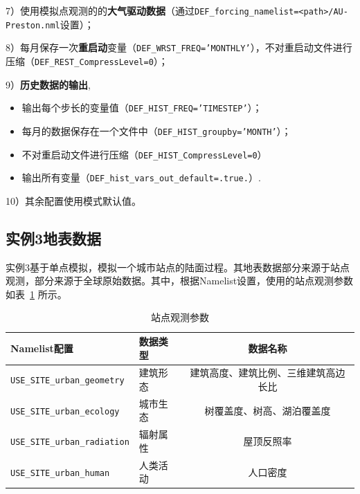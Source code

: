 \par
7）使用模拟点观测的的\textbf{大气驱动数据}（通过\texttt{DEF\_forcing\_namelist=<path>/AU-Preston.nml}设置）；\par
8）每月保存一次\textbf{重启动}变量（\texttt{DEF\_WRST\_FREQ='MONTHLY'}），不对重启动文件进行压缩（\texttt{DEF\_\allowbreak REST\_\allowbreak CompressLevel=0}）；\par
9）\textbf{历史数据的输出},
\begin{itemize}[nosep,leftmargin=4em]
    \item 输出每个步长的变量值（\texttt{DEF\_HIST\_FREQ='TIMESTEP'}）；
    \item 每月的数据保存在一个文件中（\texttt{DEF\_HIST\_groupby='MONTH'}）；
    \item 不对重启动文件进行压缩（\texttt{DEF\_HIST\_CompressLevel=0}）
    \item 输出所有变量（\texttt{DEF\_hist\_vars\_out\_default=.true.}）.
\end{itemize} \par
10）其余配置使用模式默认值。

\subsection{实例3地表数据}

实例3基于单点模拟，模拟一个城市站点的陆面过程。其地表数据部分来源于站点观测，部分来源于全球原始数据。其中，根据Namelist设置，使用的站点观测参数如表~\ref{ex3table_para} 所示。

\begin{table}[htbp]
\caption{站点观测参数}
\centering \renewcommand{\arraystretch}{1.5}
\label{ex3table_para}
\begin{tabular}{llc}
\toprule
\textbf{Namelist配置} & \textbf{数据类型} & \textbf{数据名称} \\

\midrule

\texttt{USE\_SITE\_urban\_geometry} & 建筑形态 & 建筑高度、建筑比例、三维建筑高边长比  \\
\texttt{USE\_SITE\_urban\_ecology} & 城市生态 & 树覆盖度、树高、湖泊覆盖度 \\
\texttt{USE\_SITE\_urban\_radiation} & 辐射属性 & 屋顶反照率  \\
\texttt{USE\_SITE\_urban\_human} & 人类活动 & 人口密度  \\

\bottomrule
\end{tabular}
\end{table}

